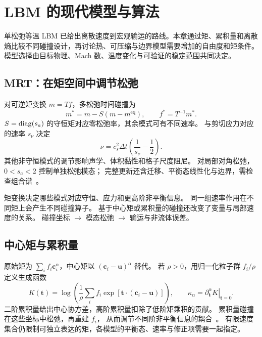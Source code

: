 \chapter{LBM 的现代模型与算法}\label{ch:16}
\begin{chaptersummary}
单松弛等温 LBM 已给出离散速度到宏观输运的路线。本章通过矩、累积量和离散熵比较不同碰撞设计，再讨论热、可压缩与边界模型需要增加的自由度和矩条件。模型选择由目标物理、Mach 数、温度变化与可验证的稳定范围共同决定。
\end{chaptersummary}

\section{MRT：在矩空间中调节松弛}
对可逆矩变换 $m=Tf$，多松弛时间碰撞为
\[
m^*=m-S(m-m^{\mathrm{eq}}),\qquad
f^*=T^{-1}m^*.
\]
$S=\operatorname{diag}(s_a)$ 的守恒矩对应零松弛率，其余模式可有不同速率。
与剪切应力对应的速率 $s_\nu$ 决定
\[
\nu=c_s^2\Delta t\left(\frac1{s_\nu}-\frac12\right).
\]
其他非守恒模式的调节影响声学、体积黏性和格子尺度阻尼。
对局部对角松弛，$0<s_a<2$ 控制单独松弛模态；
完整更新还含迁移、平衡态线性化与边界，需检查组合谱~\cite{dhumieres2002}。

{矩变换决定哪些模式对应守恒、应力和更高阶非平衡信息。
同一组速率作用在不同矩上会产生不同碰撞算子。
基于中心矩或累积量的碰撞还改变了变量与局部速度的关系。}
{碰撞坐标 $\longrightarrow$ 模态松弛 $\longrightarrow$ 输运与非流体误差。}

\section{中心矩与累积量}
原始矩为 $\sum_i f_i\bm c_i^\alpha$，中心矩以
$(\bm c_i-\bm u)^\alpha$ 替代。
若 $\rho>0$，用归一化粒子群 $f_i/\rho$ 定义生成函数
\[
K(\bm t)=\log\left(\frac1\rho\sum_i f_i
\exp[\bm t\cdot(\bm c_i-\bm u)]\right),\qquad
\kappa_\alpha=\left.\partial_{\bm t}^{\alpha}K\right|_{\bm t=0}.
\]
二阶累积量给出中心协方差，高阶累积量扣除了低阶矩乘积的贡献。
累积量碰撞在这些坐标中松弛，再重建 $f_i$，
从而调节不同阶非平衡信息的耦合~\cite{geier2015}。
有限速度集合仍限制可独立表达的矩，各模型的平衡态、速率与修正项需要一起指定。

